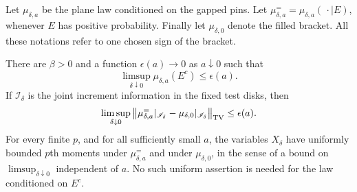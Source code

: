 Let $\mu_{\delta,a}$ be the plane law conditioned on the gapped
pins.  Let $\mu^{=}_{\delta,a}=\mu_{\delta,a}(\,\cdot\mid E)$,
whenever $E$ has positive probability.  Finally let
$\mu_{\delta,0}$ denote the filled bracket.  All these notations
refer to one chosen sign of the bracket.

\begin{lemma}\label{lem:gap-filling}
There are $\beta>0$ and a function $\epsilon(a)\to0$ as
$a\downarrow0$ such that
\begin{equation}\label{eq:offset-high-probability}
 \limsup_{\delta\downarrow0}\mu_{\delta,a}(E^c)
        \le\epsilon(a).
\end{equation}
If $\mathscr I_\delta$ is the joint increment information in the
fixed test disks, then
\begin{equation}\label{eq:gap-tv}
 \limsup_{\delta\downarrow0}
 \big\|\mu^{=}_{\delta,a}|_{\mathscr I_\delta}
          -\mu_{\delta,0}|_{\mathscr I_\delta}\big\|_{\rm TV}
       \le\epsilon(a).
\end{equation}
For every finite $p$, and for all sufficiently small $a$, the
variables $X_\delta$ have uniformly bounded $p$th moments under
$\mu^{=}_{\delta,a}$ and under $\mu_{\delta,0}$, in the sense
of a bound on $\limsup_{\delta\downarrow0}$ independent of $a$.
No such uniform assertion is needed for the law conditioned on
$E^c$.
\end{lemma}

